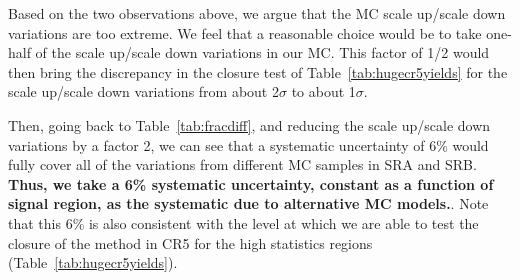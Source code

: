 

Based on the two observations above, we argue that the MC 
scale up/scale down variations are too extreme.  We feel that
a reasonable choice would be to take one-half of the scale up/scale
down variations in our MC.  This factor of 1/2 would then bring 
the discrepancy in the closure test of 
Table~\ref{tab:hugecr5yields} for the scale up/scale down variations
from about 2$\sigma$ to about 1$\sigma$.

Then, going back to Table~\ref{tab:fracdiff}, and reducing the scale
up/scale
down variations by a factor 2, we can see that a systematic
uncertainty
of 6\% would fully cover all of the variations from different MC
samples in SRA and SRB.
{\bf Thus, we take a 6\% systematic uncertainty,  constant as a 
function of signal region, as the systematic due to alternative MC
models.}.
Note that this 6\% is also consistent with the level at which we are
able
to test the closure of the method in CR5 for the high statistics
regions 
(Table~\ref{tab:hugecr5yields}).










